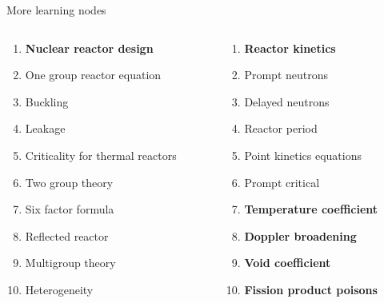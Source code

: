 \documentclass[aspectratio=1610,pdftex,dvipsnames,compress,xcolor={dvipsnames}]{beamer}
\begin{document}
\begin{frame}{More learning nodes}
    \begin{columns}[t]

        \begin{column}{0.50\textwidth}
            \begin{enumerate}[series=outerlist,topsep=0pt,itemsep=1pt,leftmargin=*,label=(\arabic*)]
                \item[]\textbf{Nuclear reactor design}
                \item[]One group reactor equation
                \item[]Buckling
                \item[]Leakage
                \item[]Criticality for thermal reactors
                \item[]Two group theory
                \item[]Six factor formula
                \item[]Reflected reactor
                \item[]Multigroup theory
                \item[]Heterogeneity
            \end{enumerate}
        \end{column}

        \begin{column}{0.50\textwidth}
            \begin{enumerate}[series=outerlist,topsep=0pt,itemsep=1pt,leftmargin=*,label=(\arabic*)]
                \item[]\hfill\textbf{Reactor kinetics}
                \item[]\hfill Prompt neutrons
                \item[]\hfill Delayed neutrons
                \item[]\hfill Reactor period
                \item[]\hfill Point kinetics equations
                \item[]\hfill Prompt critical
                    \vspace{0.15in}
                \item[]\hfill\textbf{Temperature coefficient}
                    \vspace{0.15in}
                \item[]\hfill\textbf{Doppler broadening}
                    \vspace{0.15in}
                \item[]\hfill\textbf{Void coefficient}
                    \vspace{0.15in}
                \item[]\hfill\textbf{Fission product poisons}
            \end{enumerate}
        \end{column}

    \end{columns}
\end{frame}
\end{document}
